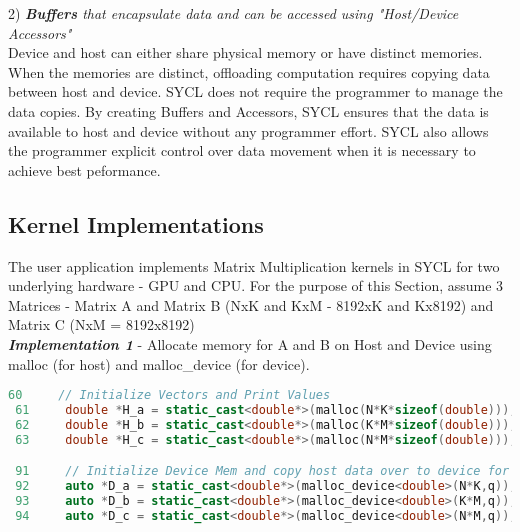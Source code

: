 \documentclass[14pt,fleqn]{article}
\begin{document}
2) \textit{\textbf{Buffers} that encapsulate data and can be accessed using "Host/Device Accessors"}\\

Device and host can either share physical memory or have distinct memories. When the memories are distinct, offloading computation requires copying data between host and device. SYCL does not require the programmer to manage the data copies. By creating Buffers and Accessors, SYCL ensures that the data is available to host and device without any programmer effort. SYCL also allows the programmer explicit control over data movement when it is necessary to achieve best peformance.\\
\newpage
\subsection{Kernel Implementations}
The user application implements Matrix Multiplication kernels in SYCL for two underlying hardware - GPU and CPU. For the purpose of this Section, assume 3 Matrices - Matrix A and Matrix B (NxK and KxM - 8192xK and Kx8192) and Matrix C (NxM = 8192x8192)\\

\textit{\textbf{Implementation 1}} - Allocate memory for A and B on Host and Device using malloc (for host) and malloc\_device (for device). 
\begin{lstlisting}[language=C++]
 60     // Initialize Vectors and Print Values
 61     double *H_a = static_cast<double*>(malloc(N*K*sizeof(double)));
 62     double *H_b = static_cast<double*>(malloc(K*M*sizeof(double)));
 63     double *H_c = static_cast<double*>(malloc(N*M*sizeof(double)));

 91     // Initialize Device Mem and copy host data over to device for processing
 92     auto *D_a = static_cast<double*>(malloc_device<double>(N*K,q));
 93     auto *D_b = static_cast<double*>(malloc_device<double>(K*M,q));
 94     auto *D_c = static_cast<double*>(malloc_device<double>(N*M,q));
\end{lstlisting}
\end{document}
